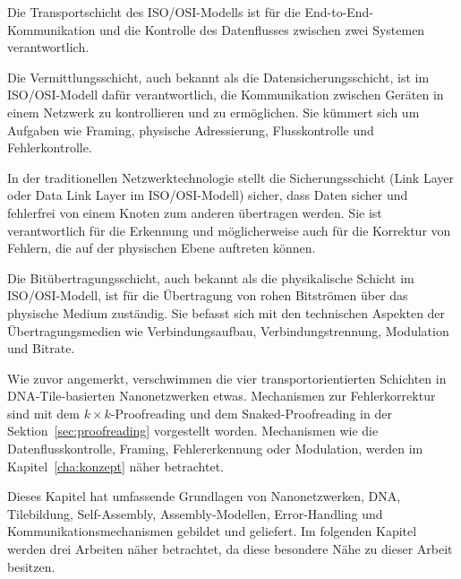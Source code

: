 Die Transportschicht des ISO/OSI-Modells ist für die End-to-End-Kommunikation und die Kontrolle des Datenflusses zwischen zwei Systemen verantwortlich.

Die Vermittlungsschicht, auch bekannt als die Datensicherungsschicht, ist im ISO/OSI-Modell dafür verantwortlich, die Kommunikation zwischen Geräten in einem Netzwerk zu kontrollieren und zu ermöglichen. Sie kümmert sich um Aufgaben wie Framing, physische Adressierung, Flusskontrolle und Fehlerkontrolle.

In der traditionellen Netzwerktechnologie stellt die Sicherungsschicht (Link Layer oder Data Link Layer im ISO/OSI-Modell) sicher, dass Daten sicher und fehlerfrei von einem Knoten zum anderen übertragen werden. Sie ist verantwortlich für die Erkennung und möglicherweise auch für die Korrektur von Fehlern, die auf der physischen Ebene auftreten können.

Die Bitübertragungsschicht, auch bekannt als die physikalische Schicht im ISO/OSI-Modell, ist für die Übertragung von rohen Bitströmen über das physische Medium zuständig. Sie befasst sich mit den technischen Aspekten der Übertragungsmedien wie Verbindungsaufbau, Verbindungstrennung, Modulation und Bitrate.

Wie zuvor angemerkt, verschwimmen die vier transportorientierten Schichten in DNA-Tile-basierten Nanonetzwerken etwas. Mechanismen zur Fehlerkorrektur sind mit dem $k \times k$-Proofreading und dem Snaked-Proofreading in der Sektion~\ref{sec:proofreading} vorgestellt worden. Mechanismen wie die Datenflusskontrolle, Framing, Fehlererkennung oder Modulation, werden im Kapitel~\ref{cha:konzept} näher betrachtet.

Dieses Kapitel hat umfassende Grundlagen von Nanonetzwerken, DNA, Tilebildung, Self-Assembly, Assembly-Modellen, Error-Handling und Kommunikationsmechanismen gebildet und geliefert. Im folgenden Kapitel werden drei Arbeiten näher betrachtet, da diese besondere Nähe zu dieser Arbeit besitzen.
